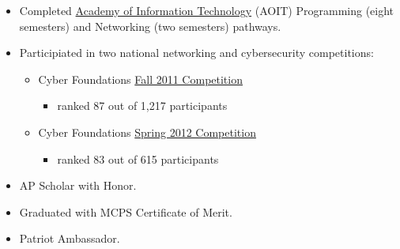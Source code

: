 \documentclass[11pt]{article}
\begin{document}
\begin{itemize}
\item Completed \href{http://woottonaoit.org/}{Academy of Information Technology} (AOIT) Programming (eight semesters) and Networking (two semesters) pathways.
\item Participiated in two national networking and cybersecurity competitions:
\begin{itemize}
\item Cyber Foundations \href{http://web.archive.org/web/20120113015059/http://www.uscyberchallenge.org/competitions-camps/cyber-foundations/registration/documents/CyberFoundationsFall2011NationalRankPDFrev12-8.pdf}{Fall 2011 Competition} 
\begin{itemize}
\item ranked 87 out of 1,217 participants
\end{itemize}
\item Cyber Foundations \href{https://www.cyberfoundations.org/event/results/2012Spring?page=2}{Spring 2012 Competition}
\begin{itemize}
\item ranked 83 out of 615 participants
\end{itemize}
\end{itemize}
\item AP Scholar with Honor.
\item Graduated with MCPS Certificate of Merit.
\item Patriot Ambassador.
\end{itemize}






\end{document}
